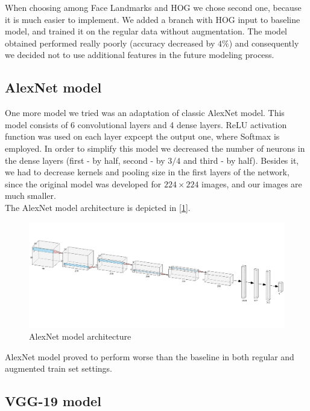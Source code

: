When choosing among Face Landmarks and HOG we chose second one, because it is much easier to implement. We added a branch with HOG input to baseline model, and trained it on the regular data without augmentation. The model obtained performed really poorly (accuracy decreased by $4\%$) and consequently we decided not to use additional features in the future modeling process.

\subsection{AlexNet model}

One more model we tried was an adaptation of classic AlexNet model. This model consists of 6 convolutional layers and 4 dense layers. ReLU activation function was used on each layer expcept the output one, where Softmax is employed. In order to simplify this model we decreased the number of neurons in the dense layers (first - by half, second - by $3/4$ and third - by half). Besides it, we had to decrease kernels and pooling size in the first layers of the network, since the original model was developed for $224\times 224$ images, and our images are much smaller.\\

The AlexNet model architecture is depicted in [\ref{fig:alexnet}].\\

\begin{figure}
	\centering
	\includegraphics[width=\textwidth]{../images/alexnet-architecture.png}
	\caption{AlexNet model architecture}
	\label{fig:alexnet}
\end{figure}

AlexNet model proved to perform worse than the baseline in both regular and augmented train set settings.

\subsection{VGG-19 model}

